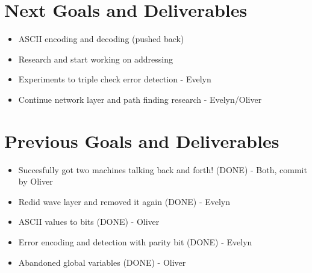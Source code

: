 \documentclass{article}
\begin{document}
\section*{Next Goals and Deliverables}
\begin{itemize}
\item ASCII encoding and decoding (pushed back)
\item Research and start working on addressing
\item Experiments to triple check error detection - Evelyn
\item Continue network layer and path finding research - Evelyn/Oliver
\end{itemize}
\section*{Previous Goals and Deliverables}
\begin{itemize}
\item Succesfully got two machines talking back and forth! (DONE) - Both, commit by Oliver
\item Redid wave layer and removed it again (DONE) - Evelyn
\item ASCII values to bits (DONE) - Oliver
\item Error encoding and detection with parity bit (DONE) - Evelyn
\item Abandoned global variables (DONE) - Oliver
\end{itemize}
\end{document}
